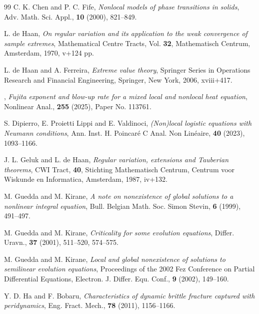 \documentclass[12pt,reqno]{amsart}
\theoremstyle{plain}
\theoremstyle{definition}
\theoremstyle{remark}
\numberwithin{equation}{section}
\begin{document}
\begin{thebibliography}{99}
 C. K. Chen and P. C. Fife, {\em Nonlocal models of phase transitions in solids}, Adv. Math. Sci. Appl., {\bf 10} (2000), 821--849.



 {L. de Haan}, {\em On regular variation and its application to the weak convergence of sample extremes}, {Mathematical Centre Tracts}, Vol. {\bf 32}, {Mathematisch Centrum, Amsterdam}, {1970}, {v+124 pp.}

 {L. de Haan and A. Ferreira}, {\em Extreme value theory}, {Springer Series in Operations Research and Financial Engineering}, {Springer, New York}, {2006}, {xviii+417}.

, {\em Fujita exponent and blow-up rate for a mixed local and nonlocal heat equation}, {Nonlinear Anal.}, {\bf 255} (2025), {Paper No. 113761}.



 S. Dipierro, E. Proietti Lippi and E. Valdinoci, {\em (Non)local logistic equations with Neumann conditions}, Ann. Inst. H. Poincaré C Anal. Non Linéaire, {\bf 40} (2023), 1093--1166.




 {J. L. Geluk and L. de Haan}, {\em Regular variation, extensions and {T}auberian theorems}, {CWI Tract}, {\bf 40}, {Stichting Mathematisch Centrum, Centrum voor Wiskunde en Informatica, Amsterdam}, {1987}, {iv+132}.

 M. Guedda and M. Kirane, {\em A note on nonexistence of global solutions to a nonlinear integral equation}, Bull. Belgian Math. Soc. Simon Stevin, {\bf 6} (1999), 491--497.

 M. Guedda and M. Kirane, {\em Criticality for some evolution equations}, Differ. Uravn., {\bf 37} (2001), 511--520, 574--575.

 M. Guedda and M. Kirane, {\em Local and global nonexistence of solutions to semilinear evolution equations}, Proceedings of the 2002 Fez Conference on Partial Differential Equations, Electron. J. Differ. Equ. Conf., {\bf 9} (2002), 149--160.

 Y. D. Ha and F. Bobaru, {\em Characteristics of dynamic brittle fracture captured with peridynamics}, Eng. Fract. Mech., {\bf 78} (2011), 1156--1166.


\end{thebibliography}
\end{document}
